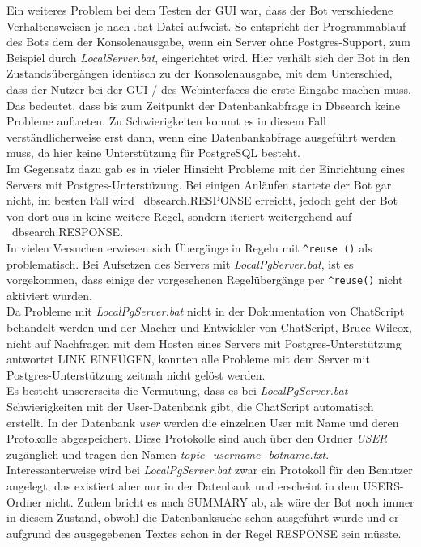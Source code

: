 Ein weiteres Problem bei dem Testen der GUI war, dass der Bot verschiedene Verhaltensweisen je nach .bat-Datei aufweist. So entspricht der Programmablauf des Bots dem der Konsolenausgabe, wenn ein Server ohne Postgres-Support, zum Beispiel durch \textit{LocalServer.bat}, eingerichtet wird. Hier verhält sich der Bot in den Zustandsübergängen identisch zu der Konsolenausgabe, mit dem Unterschied, dass der Nutzer  bei der GUI / des Webinterfaces die erste Eingabe machen muss.\\
Das bedeutet, dass bis zum Zeitpunkt der Datenbankabfrage in Dbsearch keine Probleme auftreten. Zu Schwierigkeiten kommt es in diesem Fall verständlicherweise erst dann, wenn eine Datenbankabfrage ausgeführt werden muss, da hier keine Unterstützung für PostgreSQL besteht.\\
Im Gegensatz dazu gab es in vieler Hinsicht Probleme mit der Einrichtung eines Servers mit Postgres-Unterstüzung. Bei einigen Anläufen startete der Bot gar nicht, im besten Fall wird ~dbsearch.RESPONSE erreicht, jedoch geht der Bot von dort aus in keine weitere Regel, sondern iteriert weitergehend auf ~dbsearch.RESPONSE.\\
In vielen Versuchen erwiesen sich Übergänge in Regeln mit \lstinline|^reuse ()| als problematisch. Bei Aufsetzen des Servers mit \textit{LocalPgServer.bat}, ist es vorgekommen, dass einige der vorgesehenen Regelübergänge per \lstinline|^reuse()| nicht aktiviert wurden. \\
Da Probleme mit \textit{LocalPgServer.bat} nicht in der Dokumentation von ChatScript behandelt werden und der Macher und Entwickler von ChatScript, Bruce Wilcox, nicht auf Nachfragen mit dem Hosten eines Servers mit Postgres-Unterstützung antwortet \textcolor[rgb]{1,0.68,0.36}{LINK EINFÜGEN}, konnten alle Probleme mit dem Server mit Postgres-Unterstützung zeitnah nicht gelöst werden.\\
Es besteht unsererseits die Vermutung, dass es bei \textit{LocalPgServer.bat} Schwierigkeiten mit der User-Datenbank gibt, die ChatScript automatisch erstellt. In der Datenbank \textit{user} werden die einzelnen User mit Name und deren Protokolle abgespeichert. Diese Protokolle sind auch über den Ordner \textit{USER} zugänglich und tragen den Namen \textit{topic\_username\_botname.txt}. Interessanterweise wird bei \textit{LocalPgServer.bat} zwar ein Protokoll für den Benutzer angelegt, das existiert aber nur in der Datenbank und erscheint in dem USERS-Ordner nicht. Zudem bricht es nach SUMMARY ab, als wäre der Bot noch immer in diesem Zustand, obwohl die Datenbanksuche schon ausgeführt wurde und er aufgrund des ausgegebenen Textes schon in der Regel RESPONSE sein müsste.\\
